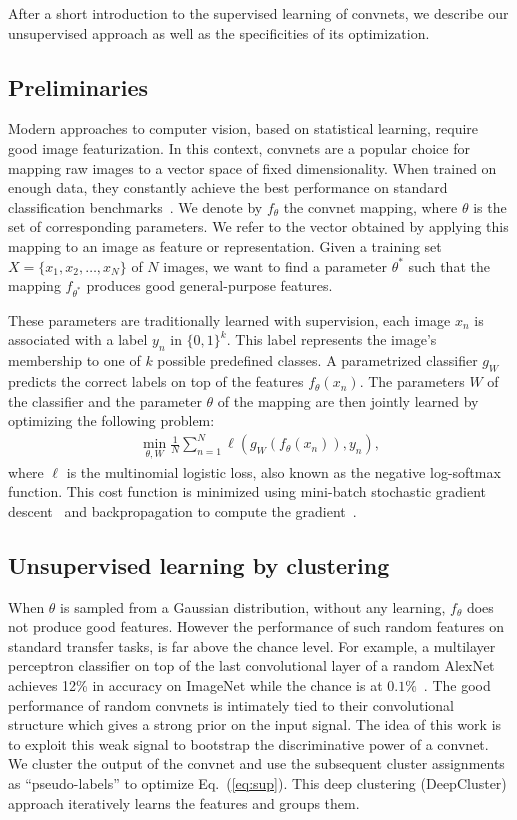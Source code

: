 After a short introduction to the supervised learning of convnets, we describe our unsupervised approach as well as the specificities of its optimization.

\subsection{Preliminaries}
Modern approaches to computer vision, based on statistical learning, require good image featurization.
In this context, convnets are a popular choice for mapping raw images to a vector space of fixed dimensionality.
When trained on enough data, they constantly achieve the best performance on standard classification benchmarks~\cite{he2015delving,krizhevsky2012imagenet}.
We denote by $f_\theta$ the convnet mapping, where $\theta$ is the set of corresponding parameters.
We refer to the vector obtained by applying this mapping to an image as feature or representation.
Given a training set $X = \{x_1, x_2, \dots , x_N\}$ of $N$ images, we want to find a parameter $\theta^*$ such that the mapping $f_{\theta^*}$ produces good general-purpose features.

These parameters are traditionally learned with supervision, \ie each image $x_n$ is associated with a label $y_n$ in $\{0,1\}^k$.
This label represents the image's membership to one of $k$ possible predefined classes.
A parametrized classifier $g_W$ predicts the correct labels on top of the features $f_\theta(x_n)$.
The parameters $W$ of the classifier and the parameter $\theta$ of the mapping are then jointly learned by optimizing the following problem:
\begin{eqnarray}\label{eq:sup}
  \min_{\theta, W} \frac{1}{N} \sum_{n=1}^N \ell\left(g_W\left( f_\theta(x_n) \right), y_n\right),
\end{eqnarray}
where $\ell$ is the multinomial logistic loss, also known as the negative log-softmax function.
This cost function is minimized using mini-batch stochastic gradient descent~\cite{bottou2012stochastic} and backpropagation to compute the gradient~\cite{lecun1998gradient}.


\subsection{Unsupervised learning by clustering}
When $\theta$ is sampled from a Gaussian distribution, without any learning, $f_\theta$ does not produce good features.
However the performance of such random features on standard transfer tasks, is far above the chance level.
For example, a multilayer perceptron classifier on top of the last convolutional layer of a random AlexNet achieves 12\% in accuracy on ImageNet while the chance is at $0.1\%$~\cite{noroozi2016unsupervised}.
The good performance of random convnets is intimately tied to their convolutional structure which gives a strong prior on the input signal.
The idea of this work is to exploit this weak signal to bootstrap the discriminative power of a convnet.
We cluster the output of the convnet and use the subsequent cluster assignments as ``pseudo-labels'' to optimize Eq.~(\ref{eq:sup}).
This deep clustering (DeepCluster) approach iteratively learns the features and groups them.

